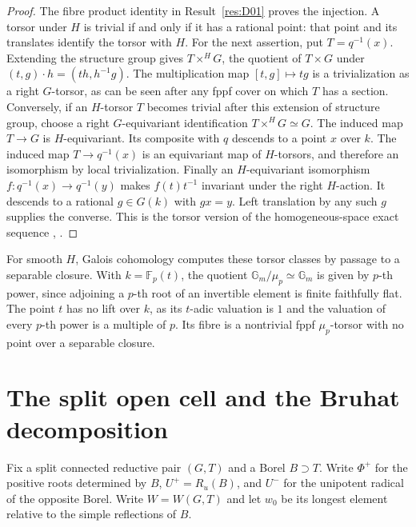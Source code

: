 \documentclass[11pt,a4paper,openany,oneside]{book}
\theoremstyle{resultstyle}
\theoremstyle{definition}
\numberwithin{equation}{chapter}
\newcommand{\Gm}{\mathbb{G}_m}
\newcommand{\FF}{\mathbb{F}}
\begin{document}
\begin{proof}
The fibre product identity in Result~\ref{res:D01} proves the injection. A torsor under \(H\) is trivial if and only if it has a rational point: that point and its translates identify the torsor with \(H\). For the next assertion, put \(T=q^{-1}(x)\). Extending the structure group gives \(T\times^H G\), the quotient of \(T\times G\) under \((t,g)\cdot h=(th,h^{-1}g)\). The multiplication map \([t,g]\mapsto tg\) is a trivialization as a right \(G\)-torsor, as can be seen after any fppf cover on which \(T\) has a section. Conversely, if an \(H\)-torsor \(T\) becomes trivial after this extension of structure group, choose a right \(G\)-equivariant identification \(T\times^H G\simeq G\). The induced map \(T\to G\) is \(H\)-equivariant. Its composite with \(q\) descends to a point \(x\) over \(k\). The induced map \(T\to q^{-1}(x)\) is an equivariant map of \(H\)-torsors, and therefore an isomorphism by local trivialization. Finally an \(H\)-equivariant isomorphism \(f:q^{-1}(x)\to q^{-1}(y)\) makes \(f(t)t^{-1}\) invariant under the right \(H\)-action. It descends to a rational \(g\in G(k)\) with \(gx=y\). Left translation by any such \(g\) supplies the converse. This is the torsor version of the homogeneous-space exact sequence \cite[Section 5.b and Appendix B]{milne}, \cite[Example A.1.2]{conradfeng}.
\end{proof}

For smooth \(H\), Galois cohomology computes these torsor classes by passage to a separable closure. With \(k=\FF_p(t)\), the quotient \(\Gm/\mu_p\simeq\Gm\) is given by \(p\)-th power, since adjoining a \(p\)-th root of an invertible element is finite faithfully flat. The point \(t\) has no lift over \(k\), as its \(t\)-adic valuation is \(1\) and the valuation of every \(p\)-th power is a multiple of \(p\). Its fibre is a nontrivial fppf \(\mu_p\)-torsor with no point over a separable closure.

\section{The split open cell and the Bruhat decomposition}

Fix a split connected reductive pair \((G,T)\) and a Borel \(B\supset T\). Write \(\Phi^+\) for the positive roots determined by \(B\), \(U^+=R_u(B)\), and \(U^-\) for the unipotent radical of the opposite Borel. Write \(W=W(G,T)\) and let \(w_0\) be its longest element relative to the simple reflections of \(B\).
\end{document}
